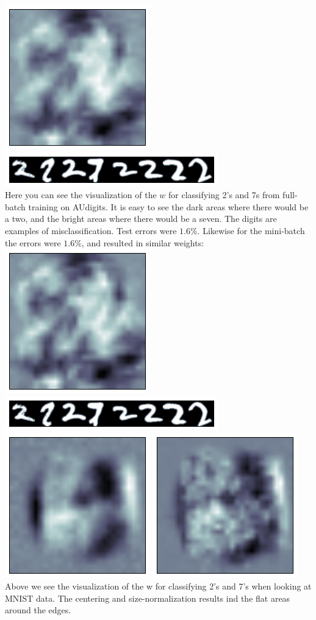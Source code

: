 \documentclass[a4paper,10pt,article,oneside,english]{memoir}
\begin{document}
\includegraphics[scale=0.2]{nll_pict1.png}
\includegraphics[scale=0.8]{nll_pict1_0.png}\\
Here you can see the visualization of the $w$ for classifying 2's and 7s from full-batch training on AUdigits. It is easy to see the dark areas where there would be a two, and the bright areas where there would be a seven. The digits are examples of misclassification. Test errors were $1.6\%$. Likewise for the mini-batch the errors were $1.6\%$, and resulted in similar weights:\\
\includegraphics[scale=0.2]{nll_pict2.png}
\includegraphics[scale=0.8]{nll_pict2_0.png}\\

\includegraphics[width=0.2\linewidth]{nll_pict3.png}
\includegraphics[width=0.2\linewidth]{nll_pict4.png}\\
Above we see the visualization of the w for classifying 2's and 7's when looking at MNIST data. The centering and size-normalization results ind the flat areas around the edges.
\end{document}
